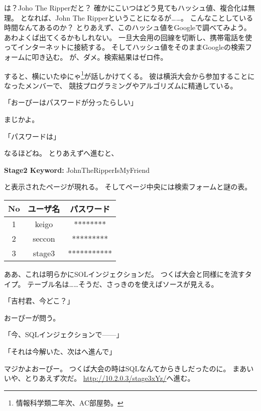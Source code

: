 は？Joho The Ripperだと？
確かにこいつはどう見てもハッシュ値、複合化は無理。
となれば、John The Ripperということになるが……。
こんなことしている時間なんてあるのか？
とりあえず、このハッシュ値をGoogleで調べてみよう。
あわよくば出てくるかもしれない。
一旦大会用の回線を切断し、携帯電話を使ってインターネットに接続する。
そしてハッシュ値をそのままGoogleの検索フォームに叩き込む。
が、ダメ。検索結果はゼロ件。

すると、横にいたゆにゃ\footnote{情報科学類二年次、AC部屋勢。}が話しかけてくる。
彼は横浜大会から参加することになったメンバーで、
競技プログラミングやアルゴリズムに精通している。

「おーぴーはパスワードが分ったらしい」

まじかよ。

「パスワードは」

なるほどね。
とりあえずへ進むと、

\begin{screen}
\centering
\textbf{Stage2 Keyword:} JohnTheRipperIsMyFriend 
\end{screen}

と表示されたページが現れる。
そしてページ中央には検索フォームと謎の表。

\begin{table}[H]
	\centering
	\begin{tabular}{|c|c|c|}
		\hline
		\textbf{No} & \textbf{ユーザ名} & \textbf{パスワード} \\ \hline
		1 & keigo & ******** \\ \hline
		2 & seccon & ********* \\ \hline
		3 & stage3 & *********** \\ \hline
	\end{tabular}
\end{table}

ああ、これは明らかにSOLインジェクションだ。
つくば大会と同様にを流すタイプ。
テーブル名は……そうだ、さっきのを使えばソースが見える。

「吉村君、今どこ？」

おーぴーが問う。

「今、SQLインジェクションで------」

「それは今解いた、次はへ進んで」

マジかよおーぴー。
つくば大会の時はSQLなんてからきしだったのに。
まあいいや、とりあえず次だ。
\url{http://10.2.0.3/stage3xYz/}へ進む。



